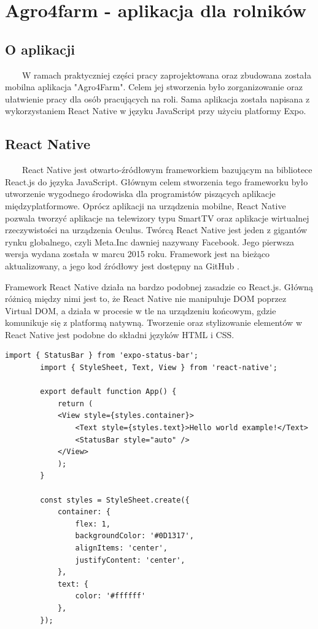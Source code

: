 \documentclass[a4paper,12pt,oneside]{book}
\begin{document}
	\newpage
	\chapter{Agro4farm - aplikacja dla rolników}
	
	\section{O aplikacji}
	\ \ \ \
	W ramach praktyczniej części pracy zaprojektowana oraz zbudowana została mobilna aplikacja "Agro4Farm". Celem jej stworzenia było zorganizowanie oraz ułatwienie pracy dla osób pracujących na roli. Sama aplikacja została napisana z wykorzystaniem React Native w języku JavaScript przy użyciu platformy Expo.
	
	\section{React Native}
	\ \ \ \
	React Native jest otwarto-źródłowym frameworkiem bazującym na bibliotece React.js do języka JavaScript. Głównym celem stworzenia tego frameworku było utworzenie wygodnego środowiska dla programistów piszących aplikacje międzyplatformowe. Oprócz aplikacji na urządzenia mobilne, React Native pozwala tworzyć aplikacje na telewizory typu SmartTV oraz aplikacje wirtualnej rzeczywistości na urządzenia Oculus. Twórcą React Native jest jeden z gigantów rynku globalnego, czyli Meta.Inc dawniej nazywany Facebook. Jego pierwsza wersja wydana została w marcu 2015 roku. Framework jest na bieżąco aktualizowany, a jego kod źródłowy jest dostępny na GitHub \cite{ref9}.
	
	\newpage
	
	Framework React Native działa na bardzo podobnej zasadzie co React.js. Główną różnicą między nimi jest to, że React Native nie manipuluje DOM poprzez Virtual DOM, a działa w procesie w tle na urządzeniu końcowym, gdzie komunikuje się z platformą natywną. Tworzenie oraz stylizowanie elementów w React Native jest podobne do składni języków HTML i CSS.
	
	\begin{lstlisting}[caption=Kod przykłądowej aplikacji "Hello world" w React Native]
		import { StatusBar } from 'expo-status-bar';
		import { StyleSheet, Text, View } from 'react-native';
		
		export default function App() {
			return (
			<View style={styles.container}>
				<Text style={styles.text}>Hello world example!</Text>
				<StatusBar style="auto" />
			</View>
			);
		}
		
		const styles = StyleSheet.create({
			container: {
				flex: 1,
				backgroundColor: '#0D1317',
				alignItems: 'center',
				justifyContent: 'center',
			},
			text: {
				color: '#ffffff'
			},
		});
	\end{lstlisting}
\end{document}
